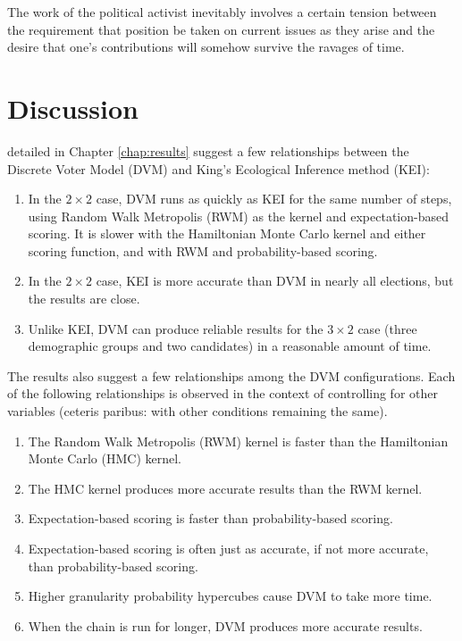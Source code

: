 \begin{savequote}[75mm]
The work of the political activist inevitably involves a certain tension between the requirement that position be taken on current issues as they arise and the desire that one's contributions will somehow survive the ravages of time.
\end{savequote}

\chapter{Discussion}
\label{chap:discussion}

 detailed in Chapter \ref{chap:results} suggest a few relationships between the Discrete Voter Model (DVM) and King's Ecological Inference method (KEI):

\begin{enumerate}
  \item In the $2 \times 2$ case, DVM runs as quickly as KEI for the same number of steps, using Random Walk Metropolis (RWM) as the kernel and expectation-based scoring. It is slower with the Hamiltonian Monte Carlo kernel and either scoring function, and with RWM and probability-based scoring.
  \item In the $2 \times 2$ case, KEI is more accurate than DVM in nearly all elections, but the results are close.
  \item Unlike KEI, DVM can produce reliable results for the $3 \times 2$ case (three demographic groups and two candidates) in a reasonable amount of time.
\end{enumerate}

The results also suggest a few relationships among the DVM configurations. Each of the following relationships is observed in the context of controlling for other variables (ceteris paribus: with other conditions remaining the same).

\begin{enumerate}
  \item The Random Walk Metropolis (RWM) kernel is faster than the Hamiltonian Monte Carlo (HMC) kernel.
  \item The HMC kernel produces more accurate results than the RWM kernel.
  \item Expectation-based scoring is faster than probability-based scoring.
  \item Expectation-based scoring is often just as accurate, if not more accurate, than probability-based scoring.
  \item Higher granularity probability hypercubes cause DVM to take more time.
  \item When the chain is run for longer, DVM produces more accurate results.
\end{enumerate}


